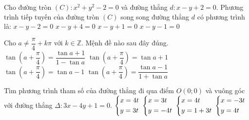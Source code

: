 \begin{ex}%
	Cho đường tròn $\left(C\right):x^2+y^2-2=0$ và đường thẳng $d: x-y+2=0$. Phương trình tiếp tuyến của đường tròn $\left(C\right)$ song song đường thẳng $d$ có phương trình là:
	\choice
	{\True $x-y-2=0$}
	{$x-y+4=0$}
	{$x-y+1=0$}
	{$x-y-1=0$}
\end{ex}
\begin{ex}%
	Cho $a\neq \dfrac{\pi}{4} + k\pi$ với $k\in \mathbb{Z}$. Mệnh đề nào sau đây đúng.
	\choice
	{\True $\tan\left(a+\dfrac{\pi}{4}\right)=\dfrac{\tan a +1}{1-\tan a}$}
	{$\tan\left(a+\dfrac{\pi}{4}\right)=\tan a +1$}
	{$\tan\left(a+\dfrac{\pi}{4}\right)=\tan a - 1$}
	{$\tan\left(a+\dfrac{\pi}{4}\right)=\dfrac{\tan a -1}{1+\tan a}$}
\end{ex}
\begin{ex}%
	Tìm phương trình tham số của đường thẳng đi qua điểm $O\left(0;0\right)$ và vuông góc với đường thẳng $\Delta: 3x-4y+1=0 $.
	\choice
	{ $\left\{\begin{aligned}&x=4t \\ &y=3t\end{aligned}\right.$}
	{\True $\left\{\begin{aligned}&x=3t \\ &y=-4t\end{aligned}\right.$}
	{$\left\{\begin{aligned}&x=4t \\ &y=1+3t\end{aligned}\right.$}
	{$\left\{\begin{aligned}&x=-3t \\ &y=4t\end{aligned}\right.$}
\end{ex}
